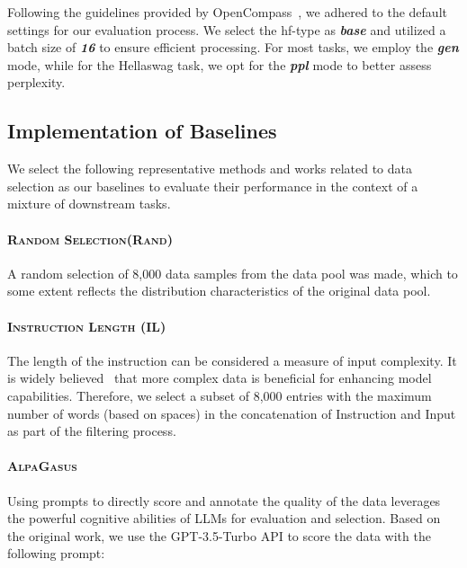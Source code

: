 Following the guidelines provided by OpenCompass~\cite{opencompass}, we adhered to the default settings for our evaluation process. We select the hf-type as \textbf{\textit{base}} and utilized a batch size of \textbf{\textit{16}} to ensure efficient processing. For most tasks, we employ the \textbf{\textit{gen}} mode, while for the Hellaswag task, we opt for the \textbf{\textit{ppl}} mode to better assess perplexity. 

\subsection{Implementation of Baselines}
\label{sec:appendix-baselines}
We select the following representative methods and works related to data selection as our baselines to evaluate their performance in the context of a mixture of downstream tasks.

\paragraph{\textsc{Random Selection(Rand)}} A random selection of 8,000 data samples from the data pool was made, which to some extent reflects the distribution characteristics of the original data pool.

\paragraph{\textsc{Instruction Length (IL)}} The length of the instruction can be considered a measure of input complexity. It is widely believed~\cite{cao2023instruction, zhao2023preliminary} that more complex data is beneficial for enhancing model capabilities. Therefore, we select a subset of 8,000 entries with the maximum number of words (based on spaces) in the concatenation of Instruction and Input as part of the filtering process.

\paragraph{\textsc{AlpaGasus~\cite{chen2024alpagasus}}} Using prompts to directly score and annotate the quality of the data leverages the powerful cognitive abilities of LLMs for evaluation and selection. Based on the original work, we use the GPT-3.5-Turbo API to score the data with the following prompt:

